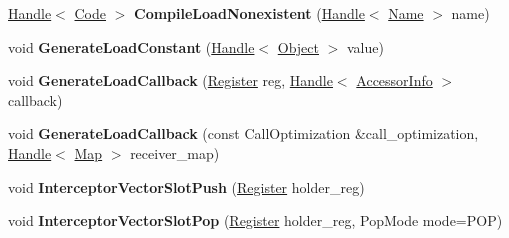 \begin{DoxyCompactItemize}
\item 
\hyperlink{classv8_1_1internal_1_1_handle}{Handle}$<$ \hyperlink{classv8_1_1internal_1_1_code}{Code} $>$ {\bfseries Compile\+Load\+Nonexistent} (\hyperlink{classv8_1_1internal_1_1_handle}{Handle}$<$ \hyperlink{classv8_1_1internal_1_1_name}{Name} $>$ name)\hypertarget{classv8_1_1internal_1_1_named_load_handler_compiler_a47beb8a7c753a9b33ae95df2b5b0044a}{}\label{classv8_1_1internal_1_1_named_load_handler_compiler_a47beb8a7c753a9b33ae95df2b5b0044a}

\item 
void {\bfseries Generate\+Load\+Constant} (\hyperlink{classv8_1_1internal_1_1_handle}{Handle}$<$ \hyperlink{classv8_1_1internal_1_1_object}{Object} $>$ value)\hypertarget{classv8_1_1internal_1_1_named_load_handler_compiler_a92c109caa65c4f6c208c3f06f2b8758b}{}\label{classv8_1_1internal_1_1_named_load_handler_compiler_a92c109caa65c4f6c208c3f06f2b8758b}

\item 
void {\bfseries Generate\+Load\+Callback} (\hyperlink{structv8_1_1internal_1_1_register}{Register} reg, \hyperlink{classv8_1_1internal_1_1_handle}{Handle}$<$ \hyperlink{classv8_1_1internal_1_1_accessor_info}{Accessor\+Info} $>$ callback)\hypertarget{classv8_1_1internal_1_1_named_load_handler_compiler_a5b2ef34680848a908a3bb1f1500174fb}{}\label{classv8_1_1internal_1_1_named_load_handler_compiler_a5b2ef34680848a908a3bb1f1500174fb}

\item 
void {\bfseries Generate\+Load\+Callback} (const Call\+Optimization \&call\+\_\+optimization, \hyperlink{classv8_1_1internal_1_1_handle}{Handle}$<$ \hyperlink{classv8_1_1internal_1_1_map}{Map} $>$ receiver\+\_\+map)\hypertarget{classv8_1_1internal_1_1_named_load_handler_compiler_a0bae3f816aaa9b03eccd72c94d8f8dc6}{}\label{classv8_1_1internal_1_1_named_load_handler_compiler_a0bae3f816aaa9b03eccd72c94d8f8dc6}

\item 
void {\bfseries Interceptor\+Vector\+Slot\+Push} (\hyperlink{structv8_1_1internal_1_1_register}{Register} holder\+\_\+reg)\hypertarget{classv8_1_1internal_1_1_named_load_handler_compiler_a6f9dc3899f3eca11120b76b949a2f1d6}{}\label{classv8_1_1internal_1_1_named_load_handler_compiler_a6f9dc3899f3eca11120b76b949a2f1d6}

\item 
void {\bfseries Interceptor\+Vector\+Slot\+Pop} (\hyperlink{structv8_1_1internal_1_1_register}{Register} holder\+\_\+reg, Pop\+Mode mode=P\+OP)\hypertarget{classv8_1_1internal_1_1_named_load_handler_compiler_ac11d260f0475b26a0fa57f137a496a88}{}\label{classv8_1_1internal_1_1_named_load_handler_compiler_ac11d260f0475b26a0fa57f137a496a88}


\end{DoxyCompactItemize}
